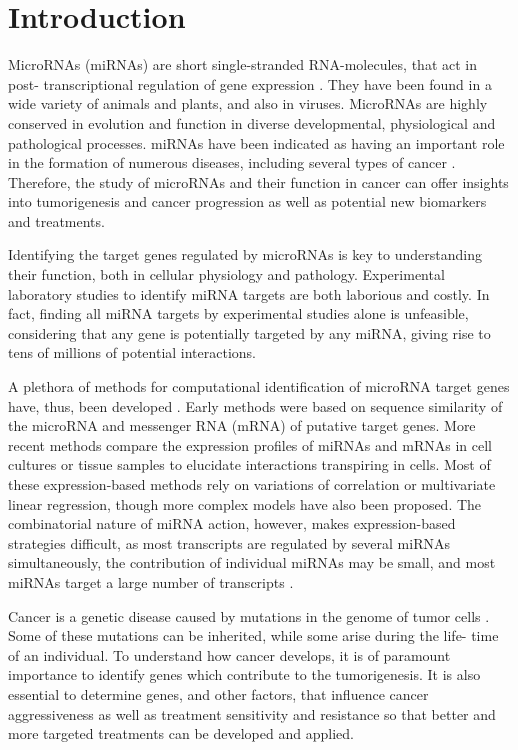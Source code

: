 
\section{Introduction}
\thispagestyle{empty}

MicroRNAs (miRNAs) are short single-stranded RNA-molecules, that act in post-
transcriptional regulation of gene expression \citep{Bartel2004}. They have
been found in a wide variety of animals and plants, and also in viruses.
MicroRNAs are highly conserved in evolution and function in diverse
developmental, physiological and pathological processes. miRNAs have been
indicated as having an important role in the formation of numerous diseases,
including several types of cancer \citep{Calin2006}. Therefore, the study of
microRNAs and their function in cancer can offer insights into tumorigenesis
and cancer progression as well as potential new biomarkers and treatments.

Identifying the target genes regulated by microRNAs is key to understanding their
function, both in cellular physiology and pathology. Experimental laboratory
studies to identify miRNA targets are both laborious and costly. In fact,
finding all miRNA targets by experimental studies alone is unfeasible, considering
that any gene is potentially targeted by any miRNA, giving rise to tens of
millions of potential interactions.

A plethora of methods for computational identification of microRNA target
genes have, thus, been developed \citep{Muniategui2013}. Early methods were based on sequence
similarity of the microRNA and messenger RNA (mRNA) of putative target genes.
More recent methods compare the expression profiles of miRNAs and mRNAs in
cell cultures or tissue samples to elucidate interactions transpiring in
cells. Most of these expression-based methods rely on variations of
correlation or multivariate linear regression, though more
complex models have also been proposed. The combinatorial nature of miRNA
action, however, makes expression-based strategies difficult, as most
transcripts are regulated by several miRNAs simultaneously, the contribution
of individual miRNAs may be small, and most miRNAs target a large number of
transcripts \citep{Baek2008}.

Cancer is a genetic disease caused by mutations in the genome of tumor cells \citep{Hanahan2000}.
Some of these mutations can be inherited, while some arise during the life-
time of an individual. To understand how cancer develops, it is of
paramount importance to identify genes which contribute to the tumorigenesis.
It is also essential to determine genes, and other factors, that influence
cancer aggressiveness as well as treatment sensitivity and resistance so that better
and more targeted treatments can be developed and applied.

